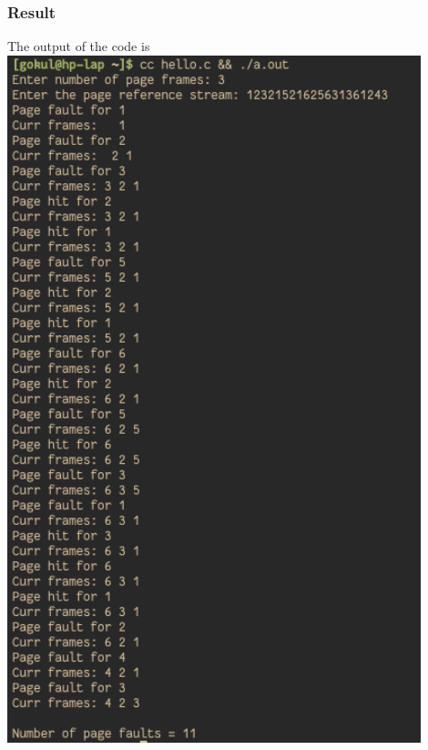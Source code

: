 \documentclass[13pt,oneside]{article}
\begin{document}
\subsubsection{Result}
The output of the code is \\
\includegraphics[width=0.9\textwidth]{img/q/ss2.png} \\
\end{document}
